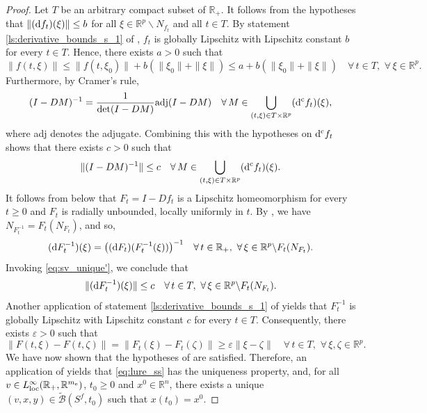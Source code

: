 \documentclass[a4paper,11pt]{article}
\newcommand{\R}{\mathbb R}
\newcommand{\sB}{{\mathcal B}}
\numberwithin{equation}{section}
\numberwithin{figure}{section}
\numberwithin{table}{section}
\begin{document}
\begin{proof} Let $T$ be an arbitrary compact subset of $\R_+$. It follows from the hypotheses that $\|({\rm d}f_t)(\xi)\|\leq b$ for all $\xi\in\R^p\backslash N_{f_t}$ and all $t\in T$. By statement \ref{ls:derivative_bounds_s_1}
of , $f_t$ is globally Lipschitz with Lipschitz constant $b$ for every $t\in T$. Hence, there exists $a>0$ such that
\begin{equation}\label{eq:sv_unique}
\|f(t,\xi)\|\leq \|f(t,\xi_0)\|+b(\|\xi_0\|+\|\xi\|)\leq a+ b(\|\xi_0\|+\|\xi\|)\quad\forall\,t\in T,\,\,\forall\,\xi\in\R^p.
\end{equation}
Furthermore, by Cramer's rule,
\[
(I-DM)^{-1}=\frac{1}{\det(I-DM)}{\rm adj}(I-DM)\quad\forall\,M\in \bigcup_{(t,\xi)\in T\times
\R^p}({\rm d}^{\rm c}f_t)(\xi),
\]
where adj denotes the adjugate.
Combining this with the hypotheses on ${\rm d}^{\rm c}f_t$ shows that there exists $c>0$ such that
\begin{equation}\label{eq:sv_unique'}
\|(I-DM)^{-1}\|\leq c\quad\forall\,M\in \bigcup_{(t,\xi)\in T\times
\R^p}({\rm d}^{\rm c}f_t)(\xi).
\end{equation}
It follows from  below that $F_t=I-Df_t$ is a Lipschitz homeomorphism
for every $t\geq 0$ and $F_t$ is radially unbounded, locally uniformly in $t$. By \cite{bd24}, we have $N_{F_t^{-1}}=F_t(N_{F_t})$, and so,
\[
({\rm d} F_t^{-1})(\xi)=\big(({\rm d}F_t)(F_t^{-1}(\xi))\big)^{-1}\quad\forall\,t\in\R_+,\,\,\forall\,\xi\in\R^p\backslash F_t(N_{F_t}).
\]
Invoking \eqref{eq:sv_unique'}, we conclude that
\[
\|({\rm d} F_t^{-1})(\xi)\|\leq c\quad\forall\,t\in T,\,\,\forall\,\xi\in\R^p\backslash F_t(N_{F_t}).
\]
Another application of statement \ref{ls:derivative_bounds_s_1} of 
yields that $F_t^{-1}$ is globally Lipschitz with Lipschitz constant $c$ for every $t\in T$. Consequently, there exists $\varepsilon>0$ such that
\[
\|F(t,\xi)-F(t,\zeta)\|=\|F_t(\xi)-F_t(\zeta)\|\geq\varepsilon\|\xi-\zeta\|\quad\forall\,t\in T,\,\,\forall\,\xi,\zeta\in\R^p.
\]
We have now shown that the hypotheses of  are satisfied. Therefore, an application
of  yields that
\eqref{eq:lure_ss} has the uniqueness property, and,
for all $v\in L^\infty_{\rm loc}(\R_+,\R^{m_{\rm e}})$, $t_0\geq 0$ and $x^0\in\R^n$, there exists a unique $(v,x,y)\in \tilde\sB(S^f,t_0)$ such that $x(t_0)=x^0$.


\end{proof}
\end{document}

